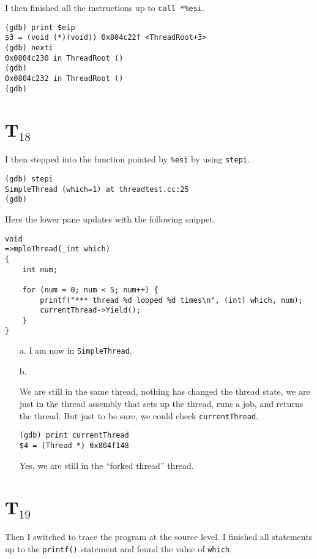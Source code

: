 \documentclass[letterpaper, 10pt]{article}
\begin{document}
	I then finished all the instructions up to {\tt call *\%esi}.

	\begin{verbatim}
(gdb) print $eip
$3 = (void (*)(void)) 0x804c22f <ThreadRoot+3>
(gdb) nexti
0x0804c230 in ThreadRoot ()
(gdb)
0x0804c232 in ThreadRoot ()
(gdb)
	\end{verbatim}

	\section*{T$_{18}$}

	I then stepped into the function pointed by {\tt \%esi} by using {\tt stepi}.

	\begin{verbatim}
(gdb) stepi
SimpleThread (which=1) at threadtest.cc:25
(gdb)
	\end{verbatim}

	Here the lower pane updates with the following snippet.

	\begin{verbatim}
void
=>mpleThread(_int which)
{
    int num;

    for (num = 0; num < 5; num++) {
        printf("*** thread %d looped %d times\n", (int) which, num);
        currentThread->Yield();
    }
}
	\end{verbatim}

	\begin{itemize}
		\item[a.]{
			I am now in {\tt SimpleThread}.
		}
		\item[b.]{
			We are still in the same thread, nothing has changed the thread state, we are just in the thread assembly that sets up the thread, runs a job, and returns the thread. But just to be sure, we could check {\tt currentThread}.

			\begin{verbatim}
(gdb) print currentThread
$4 = (Thread *) 0x804f148
			\end{verbatim}

			Yes, we are still in the ``forked thread'' thread.
		}
	\end{itemize}

	\section*{T$_{19}$}

	Then I switched to trace the program at the source level. I finished all statements up to the {\tt printf()} statement and found the value of {\tt which}.
\end{document}
